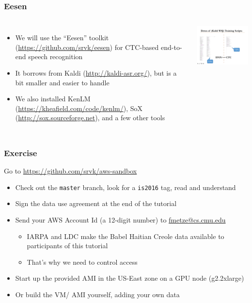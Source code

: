 \begin{frame}
  \frametitle{Eesen}
  \begin{columns}[c]
    \column{52mm}
    \begin{itemize}
    \item We will use the ``Eesen'' toolkit (\url{https://github.com/srvk/eesen}) for CTC-based end-to-end speech recognition
    \item It borrows from Kaldi (\url{http://kaldi-asr.org/}), but is a bit smaller and easier to handle
    \item We also installed KenLM (\url{https://kheafield.com/code/kenlm/}), SoX (\url{http://sox.sourceforge.net}), and a few other tools
    \end{itemize}
    \column{58mm}
    \includegraphics[width=58mm]{figures/detox}    
  \end{columns}
\end{frame}

\begin{frame}
  \frametitle{Exercise}{Go to \url{https://github.com/srvk/aws-sandbox}}
  \begin{itemize}
  \item Check out the \texttt{master} branch, look for a \texttt{is2016} tag, read and understand
  \item Sign the data use agreement at the end of the tutorial
  \item Send your AWS Account Id (a 12-digit number) to \href{mailto:fmetze@cs.cmu.edu}{fmetze@cs.cmu.edu}
    \begin{itemize}
    \item IARPA and LDC make the Babel Haitian Creole data available to participants of this tutorial
    \item That's why we need to control access
    \end{itemize}
  \item Start up the provided AMI in the US-East zone on a GPU node (g2.2xlarge)
  \item Or build the VM/ AMI yourself, adding your own data
  \end{itemize}
\end{frame}

